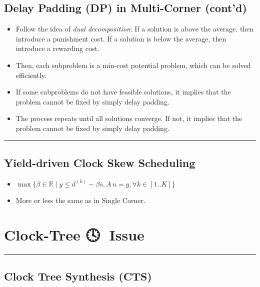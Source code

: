 \documentclass[
]{article}
\providecommand{\tightlist}{%
  \setlength{\itemsep}{0pt}\setlength{\parskip}{0pt}}
\begin{document}
\subsection{Delay Padding (DP) in Multi-Corner (cont'd)}\label{delay-padding-dp-in-multi-corner-contd}

\begin{itemize}
\tightlist
\item
  Follow the idea of \emph{dual decomposition}: If a solution is above the
  average. then introduce a punishment cost. If a solution is below
  the average, then introduce a rewarding cost.
\item
  Then, each subproblem is a min-cost potential problem, which can be
  solved efficiently.
\item
  If some subproblems do not have feasible solutions, it implies that
  the problem cannot be fixed by simply delay padding.
\item
  The process repeats until all solutions converge. If not, it implies
  that the problem cannot be fixed by simply delay padding.
\end{itemize}

\begin{center}\rule{0.5\linewidth}{0.5pt}\end{center}

\subsection{Yield-driven Clock Skew Scheduling}\label{yield-driven-clock-skew-scheduling-1}

\begin{itemize}
\tightlist
\item
  \(\max\{\beta \in \mathbb{R} \mid y \leq d^{(k)} - \beta s, A\,u = y, \forall k\in[1..K]\}\)
\item
  More or less the same as in Single Corner.
\end{itemize}

\section{Clock-Tree 🕓🌳 Issue}\label{clock-tree-issue}

\begin{center}\rule{0.5\linewidth}{0.5pt}\end{center}

\subsection{Clock Tree Synthesis (CTS)}\label{clock-tree-synthesis-cts}
\end{document}
